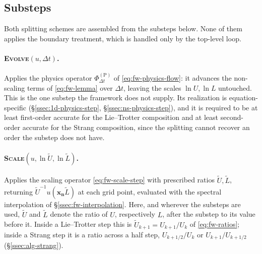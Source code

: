 \subsection{Substeps}\label{ssec:alg-substeps}
Both splitting schemes are assembled from the substeps below. None of them
applies the boundary treatment, which is handled only by the top-level loop.

\paragraph{\textsc{Evolve}$(u, \Delta t)$.}
Applies the physics operator $\Phi_{\Delta t}^{(\mathrm{P})}$ of
\eqref{eq:fw-physics-flow}: it advances the non-scaling terms of
\eqref{eq:fw-lemma} over $\Delta t$, leaving the scales $\ln U, \ln L$
untouched. This is the one substep the framework does not supply. Its
realization is equation-specific (\S\ref{ssec:1d-physics-step},
\S\ref{ssec:ns-physics-step}), and it is required to be at least first-order
accurate for the Lie--Trotter composition and at least second-order accurate
for the Strang composition, since the splitting cannot recover an order the
substep does not have.

\paragraph{\textsc{Scale}$(u, \ln \tilde U, \ln \tilde L)$.}
Applies the scaling operator \eqref{eq:fw-scale-step} with prescribed ratios
$\tilde U, \tilde L$, returning $\tilde U^{-1} u(\mathbf{x_n} \tilde L)$ at each grid
point, evaluated with the spectral interpolation of
\S\ref{ssec:fw-interpolation}. Here, and wherever the substeps are used,
$\tilde U$ and $\tilde L$ denote the ratio of $U$, respectively $L$, after the
substep to its value before it. Inside a Lie--Trotter step this is
$\tilde U_{k+1} = U_{k+1}/U_k$ of \eqref{eq:fw-ratios}; inside a Strang step it
is a ratio across a half step, $U_{k+1/2}/U_k$ or $U_{k+1}/U_{k+1/2}$
(\S\ref{ssec:alg-strang}).


